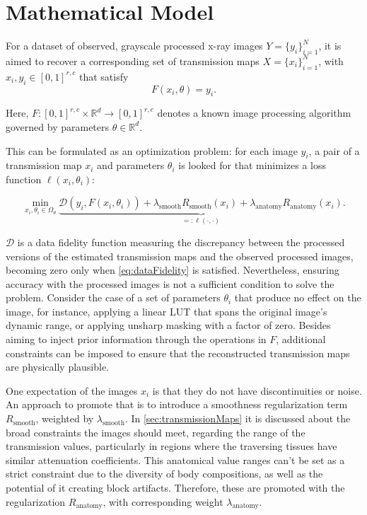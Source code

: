 \documentclass[nomenclature, english, bibtex]{kththesis}
\numberwithin{listing}{chapter}
\begin{document}
\section{Mathematical Model}
\label{sec:mathematicalModel}

For a dataset of observed, grayscale processed x-ray images $Y = \{y_i\}^N_{i=1}$, it is aimed to recover a corresponding
set of transmission maps $X = \{x_i\}^N_{i=1}$, with $x_i, y_i \in [0, 1]^{r, c}$ that satisfy
\begin{equation}
    \label{eq:dataFidelity}
    F(x_i, \theta) = y_i.
\end{equation}

Here, $F:[0,1]^{r, c} \times \mathbb{R}^d \to [0, 1]^{r, c}$ denotes a known image processing algorithm governed by
parameters $\theta \in \mathbb{R}^d$.

This can be formulated as an optimization problem: for each image $y_i$, a pair of a transmission map $x_i$ and parameters $\theta_i$ is looked for that minimizes a loss function $\ell(x_i, \theta_i)$:

\begin{equation}
    \label{eq:optimizationProblem}
    \min_{x_i, \theta_i \in \Omega_\theta}  \underbrace{\mathcal{D}(y_i, F(x_i, \theta_i)) + \lambda_{\text{smooth}} R_{\text{smooth}}(x_i) + \lambda_{\text{anatomy}} R_{\text{anatomy}}(x_i)}_{=: \ell(\cdot, \cdot)}.
\end{equation}

$\mathcal{D}$ is a data fidelity function measuring the discrepancy between the processed versions of
the estimated transmission maps and the observed processed images, becoming zero only when \autoref{eq:dataFidelity}
is satisfied. Nevertheless, ensuring accuracy with the processed images is not a sufficient condition to solve the
problem. Consider the case of a set of parameters $\theta_i$ that produce no effect on the image, for instance,
applying a linear \acrshort{LUT} that spans the original image's dynamic range, or applying unsharp masking
with a factor of zero. Besides aiming to inject prior information through the operations in $F$, additional
constraints can be imposed to ensure that the reconstructed transmission maps are physically plausible.

One expectation of the images $x_i$ is that they do not have discontinuities or noise. An approach to promote that is
to introduce a smoothness regularization term $R_{\text{smooth}}$, weighted by $\lambda_{\text{smooth}}$.
In \autoref{sec:transmissionMaps} it is discussed about the broad constraints the images should meet, regarding
the range of the transmission values, particularly in regions where the traversing tissues have similar attenuation
coefficients. This anatomical value ranges can't be set as a strict constraint due to the diversity of body compositions,
as well as the potential of it creating block artifacts. Therefore, these are promoted with the regularization
$R_{\text{anatomy}}$, with corresponding weight $\lambda_{\text{anatomy}}$.
\end{document}
